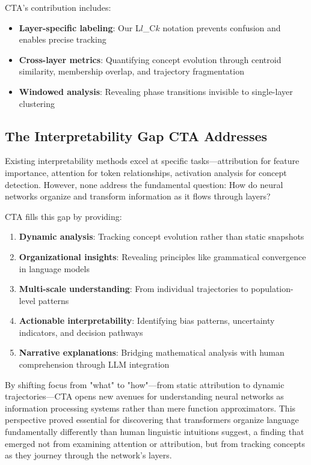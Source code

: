 CTA's contribution includes:
\begin{itemize}
    \item \textbf{Layer-specific labeling}: Our L$l$\_C$k$ notation prevents confusion and enables precise tracking
    \item \textbf{Cross-layer metrics}: Quantifying concept evolution through centroid similarity, membership overlap, and trajectory fragmentation
    \item \textbf{Windowed analysis}: Revealing phase transitions invisible to single-layer clustering
\end{itemize}

\subsection{The Interpretability Gap CTA Addresses}

Existing interpretability methods excel at specific tasks—attribution for feature importance, attention for token relationships, activation analysis for concept detection. However, none address the fundamental question: How do neural networks organize and transform information as it flows through layers?

CTA fills this gap by providing:
\begin{enumerate}
    \item \textbf{Dynamic analysis}: Tracking concept evolution rather than static snapshots
    \item \textbf{Organizational insights}: Revealing principles like grammatical convergence in language models
    \item \textbf{Multi-scale understanding}: From individual trajectories to population-level patterns
    \item \textbf{Actionable interpretability}: Identifying bias patterns, uncertainty indicators, and decision pathways
    \item \textbf{Narrative explanations}: Bridging mathematical analysis with human comprehension through LLM integration
\end{enumerate}

By shifting focus from "what" to "how"—from static attribution to dynamic trajectories—CTA opens new avenues for understanding neural networks as information processing systems rather than mere function approximators. This perspective proved essential for discovering that transformers organize language fundamentally differently than human linguistic intuitions suggest, a finding that emerged not from examining attention or attribution, but from tracking concepts as they journey through the network's layers.